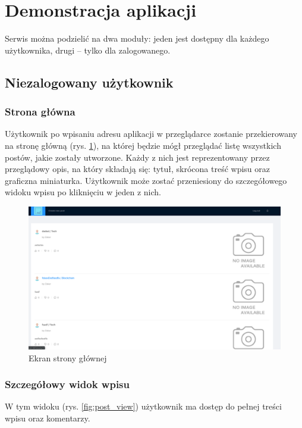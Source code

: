 \documentclass[declaration,shortabstract,polish,inz]{iithesis}
\begin{document}
\section{Demonstracja aplikacji}
Serwis można podzielić na dwa moduły: jeden jest dostępny dla każdego użytkownika, drugi – tylko dla zalogowanego.
\subsection{Niezalogowany użytkownik}
\subsubsection{Strona główna}
Użytkownik po wpisaniu adresu aplikacji w przeglądarce zostanie przekierowany na stronę główną (rys. \ref{fig:main_page}), na której będzie mógł przeglądać listę wszystkich postów, jakie zostały utworzone. Każdy z nich jest reprezentowany przez przeglądowy opis, na który składają się: tytuł, skrócona treść wpisu oraz graficzna miniaturka. Użytkownik może zostać przeniesiony do szczegółowego widoku wpisu po kliknięciu w jeden z nich.

\begin{figure}[H]
    \centering
    \includegraphics[width=\textwidth]{images/stronaglowna.png}
    \caption{Ekran strony głównej}
    \label{fig:main_page}
\end{figure}

\subsubsection{Szczegółowy widok wpisu}
W tym widoku (rys. \ref{fig:post_view}) użytkownik ma dostęp do pełnej treści wpisu oraz komentarzy.
\end{document}
